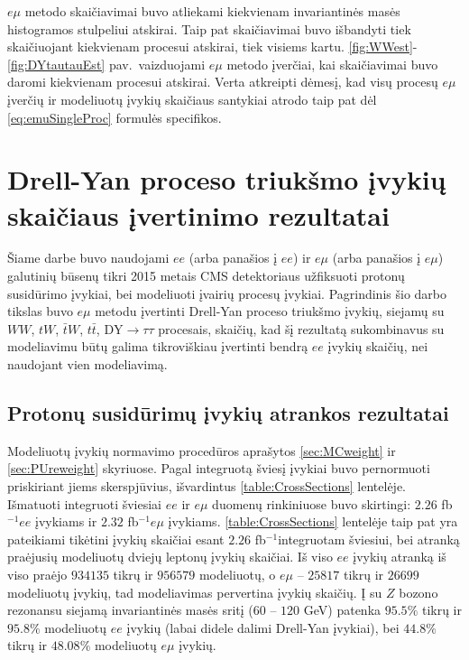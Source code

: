 \documentclass[a4paper, 12pt]{article}
\newcommand{\WW}{W\! W}
\newcommand{\DYtau}{\mathrm{DY} \! \rightarrow \! \tau\tau}
\newcommand{\invfb}{fb$^{-1}$}
\newlength\q
\begin{document}
$e\mu$ metodo skaičiavimai buvo atliekami kiekvienam invariantinės masės histogramos stulpeliui atskirai. Taip pat skaičiavimai buvo išbandyti tiek skaičiuojant kiekvienam procesui atskirai, tiek visiems kartu. \ref{fig:WWest}-\eqref{fig:DYtautauEst} pav.\ vaizduojami $e\mu$ metodo įverčiai, kai skaičiavimai buvo daromi kiekvienam procesui atskirai. Verta atkreipti dėmesį, kad visų procesų $e\mu$ įverčių ir modeliuotų įvykių skaičiaus santykiai atrodo taip pat dėl \eqref{eq:emuSingleProc} formulės specifikos.

\section{Drell-Yan proceso triukšmo įvykių skaičiaus įvertinimo rezultatai}
\vspace{-0.2cm}

Šiame darbe buvo naudojami $ee$ (arba panašios į $ee$) ir $e\mu$ (arba panašios į $e\mu$) galutinių būsenų tikri 2015 metais CMS detektoriaus užfiksuoti protonų susidūrimo įvykiai, bei modeliuoti įvairių procesų įvykiai. Pagrindinis šio darbo tikslas buvo $e\mu$ metodu įvertinti Drell-Yan proceso triukšmo įvykių, siejamų su $\WW$, $tW$, $\bar{t}W$, $t\bar{t}$, $\DYtau$ procesais, skaičių, kad šį rezultatą sukombinavus su modeliavimu būtų galima tikroviškiau įvertinti bendrą $ee$ įvykių skaičių, nei naudojant vien modeliavimą.

\vspace{-0.35cm}
\subsection{Protonų susidūrimų įvykių atrankos rezultatai} \label{sec:ppResults}
\vspace{-0.2cm}

Modeliuotų įvykių normavimo procedūros aprašytos \ref{sec:MCweight} ir \ref{sec:PUreweight} skyriuose. Pagal integruotą šviesį įvykiai buvo pernormuoti priskiriant jiems skerspjūvius, išvardintus \ref{table:CrossSections} lentelėje. Išmatuoti integruoti šviesiai $ee$ ir $e\mu$ duomenų rinkiniuose buvo skirtingi: $2.26$ \invfb  $ee$ įvykiams ir $2.32$ \invfb  $e\mu$ įvykiams. \ref{table:CrossSections} lentelėje taip pat yra pateikiami tikėtini įvykių skaičiai esant $2.26$ \invfb integruotam šviesiui, bei atranką praėjusių modeliuotų dviejų leptonų įvykių skaičiai. Iš viso $ee$ įvykių atranką iš viso praėjo $934135$ tikrų ir $956579$ modeliuotų, o $e\mu$ -- $25817$ tikrų ir $26699$ modeliuotų įvykių, tad modeliavimas pervertina įvykių skaičių. Į su $Z$ bozono rezonansu siejamą invariantinės masės sritį ($60$ -- $120$ GeV) patenka $95.5\%$ tikrų ir $95.8\%$ modeliuotų $ee$ įvykių (labai didele dalimi Drell-Yan įvykiai), bei $44.8\%$ tikrų ir $48.08\%$ modeliuotų $e\mu$ įvykių. 
\end{document}
